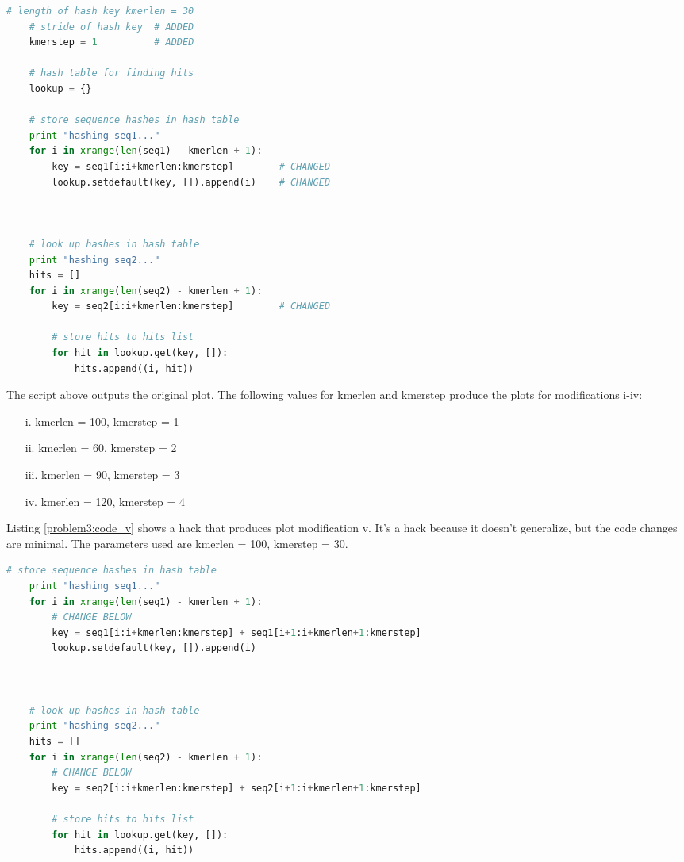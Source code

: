 \begin{lstlisting}[language=Python, caption=Changes to {\tt main} in {\tt
ps1-dotplot.py} for plot modifications i-iv, label=problem3:code]
    # length of hash key kmerlen = 30
    # stride of hash key  # ADDED
    kmerstep = 1          # ADDED
    
    # hash table for finding hits
    lookup = {}
    
    # store sequence hashes in hash table
    print "hashing seq1..."
    for i in xrange(len(seq1) - kmerlen + 1):
        key = seq1[i:i+kmerlen:kmerstep]        # CHANGED
        lookup.setdefault(key, []).append(i)    # CHANGED



    # look up hashes in hash table
    print "hashing seq2..."
    hits = []
    for i in xrange(len(seq2) - kmerlen + 1):
        key = seq2[i:i+kmerlen:kmerstep]        # CHANGED
        
        # store hits to hits list
        for hit in lookup.get(key, []):
            hits.append((i, hit))
\end{lstlisting}

The script above outputs the original plot. The following values for kmerlen
and kmerstep produce the plots for modifications i-iv:
\begin{enumerate}
  \item [i.] kmerlen = 100, kmerstep = 1
  \item [ii.] kmerlen = 60, kmerstep = 2
  \item [iii.] kmerlen = 90, kmerstep = 3
  \item [iv.] kmerlen = 120, kmerstep = 4 
\end{enumerate}

Listing \ref{problem3:code_v} shows a hack that produces plot modification
v. It's a hack because it doesn't generalize, but the code changes are minimal.
The parameters used are kmerlen = 100, kmerstep = 30.

\begin{lstlisting}[language=Python, caption=Further changes to {\tt main} in
{\tt ps1-dotplot.py} for plot modification v, label=problem3:code_v]
    # store sequence hashes in hash table
    print "hashing seq1..."
    for i in xrange(len(seq1) - kmerlen + 1):
        # CHANGE BELOW
        key = seq1[i:i+kmerlen:kmerstep] + seq1[i+1:i+kmerlen+1:kmerstep]
        lookup.setdefault(key, []).append(i)



    # look up hashes in hash table
    print "hashing seq2..."
    hits = []
    for i in xrange(len(seq2) - kmerlen + 1):
        # CHANGE BELOW
        key = seq2[i:i+kmerlen:kmerstep] + seq2[i+1:i+kmerlen+1:kmerstep]
        
        # store hits to hits list
        for hit in lookup.get(key, []):
            hits.append((i, hit))
\end{lstlisting}

